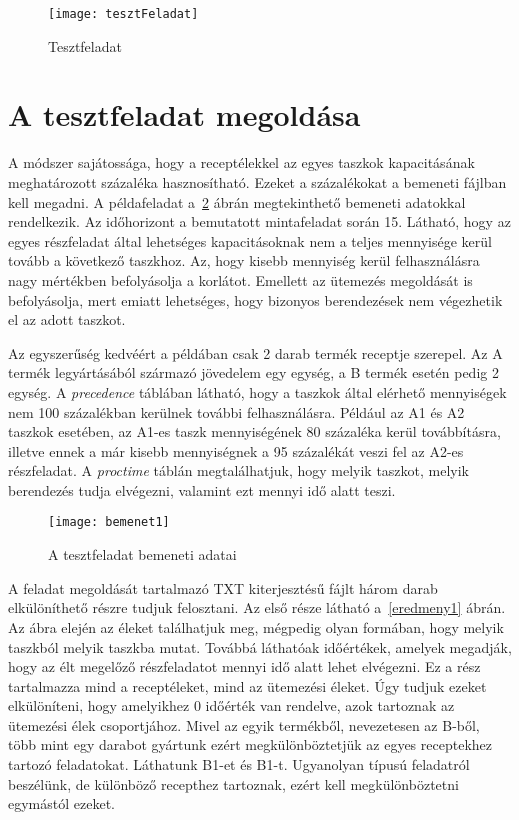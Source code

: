 \begin{figure}[H]
\begin{center}
\texttt{[image: tesztFeladat]}
\caption{Tesztfeladat}
\label{tesztFeladat}
\end{center}
\end{figure}

\section{A tesztfeladat megoldása}
A módszer sajátossága, hogy a receptélekkel az egyes taszkok kapacitásának meghatározott százaléka hasznosítható.
Ezeket a százalékokat a bemeneti fájlban kell megadni. A példafeladat a~\ref{bemenet1} ábrán megtekinthető bemeneti adatokkal rendelkezik.
Az időhorizont a bemutatott mintafeladat során 15. Látható, hogy az egyes részfeladat által lehetséges kapacitásoknak nem a teljes mennyisége kerül tovább a következő taszkhoz.
Az, hogy kisebb mennyiség kerül felhasználásra nagy mértékben befolyásolja a korlátot.
Emellett az ütemezés megoldását is befolyásolja, mert emiatt lehetséges, hogy bizonyos berendezések nem végezhetik el az adott taszkot.

Az egyszerűség kedvéért a példában csak 2 darab termék receptje szerepel.
Az A termék legyártásából származó jövedelem egy egység, a B termék esetén pedig 2 egység.
A \textit{precedence} táblában látható, hogy a taszkok által elérhető mennyiségek nem 100 százalékban kerülnek további felhasználásra.
Például az A1 és A2 taszkok esetében, az A1-es taszk mennyiségének 80 százaléka kerül továbbításra, illetve ennek a már kisebb mennyiségnek a 95 százalékát veszi fel az A2-es részfeladat.
A \textit{proctime} táblán megtalálhatjuk, hogy melyik taszkot, melyik berendezés tudja elvégezni, valamint ezt mennyi idő alatt teszi. 

\begin{figure}[H]
\begin{center}
\texttt{[image: bemenet1]}
\caption{A tesztfeladat bemeneti adatai}
\label{bemenet1}
\end{center}
\end{figure}

A feladat megoldását tartalmazó TXT kiterjesztésű fájlt három darab elkülöníthető részre tudjuk felosztani.
Az első része látható a~\ref{eredmeny1} ábrán.
Az ábra elején az éleket találhatjuk meg, mégpedig olyan formában, hogy melyik taszkból melyik taszkba mutat.
Továbbá láthatóak időértékek, amelyek megadják, hogy az élt megelőző részfeladatot mennyi idő alatt lehet elvégezni.
Ez a rész tartalmazza mind a receptéleket, mind az ütemezési éleket.
Úgy tudjuk ezeket elkülöníteni, hogy amelyikhez 0 időérték van rendelve, azok tartoznak az ütemezési élek csoportjához.
Mivel az egyik termékből, nevezetesen az B-ből, több mint egy darabot gyártunk ezért megkülönböztetjük az egyes receptekhez tartozó feladatokat.
Láthatunk B1-et és B1-t.
Ugyanolyan típusú feladatról beszélünk, de különböző recepthez tartoznak, ezért kell megkülönböztetni egymástól ezeket.
 
